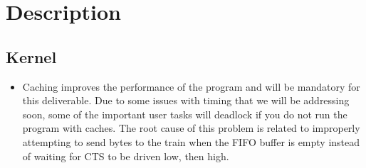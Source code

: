 \documentclass[letterpaper]{article}
\begin{document}
\section{Description%
  \label{description}%
}


\subsection{Kernel%
  \label{kernel}%
}
%
\begin{itemize}

\item Caching improves the performance of the program and will be mandatory for this deliverable.  Due to some issues with timing that we will be addressing soon, some of the important user tasks will deadlock if you do not run the program with caches.  The root cause of this problem is related to improperly attempting to send bytes to the train when the FIFO buffer is empty instead of waiting for CTS to be driven low, then high.

\end{itemize}
\end{document}
